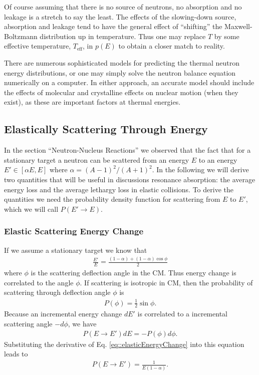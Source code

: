 \documentclass[11pt]{article}
\begin{document}
Of course assuming that there is no source of neutrons, no absorption and no leakage is a stretch to say the least.  The effects of the slowing-down source, absorption and leakage tend to have the general effect of ``shifting'' the Maxwell-Boltzmann distribution up in temperature.  Thus one may replace \(T\) by some effective temperature, \(T_{\text{eff}}\), in \(p(E)\) to obtain a closer match to reality.

There are numerous sophisticated models for predicting the thermal neutron energy distributions, or one may simply solve the neutron balance equation numerically on a computer.  In either approach, an accurate model should include the effects of molecular and crystalline effects on nuclear motion (when they exist), as these are important factors at thermal energies.
\subsection{Elastically Scattering Through Energy}
\label{sec:orgheadline34}
In the section ``Neutron-Nucleus Reactions'' we observed that the fact that for a stationary target a neutron can be scattered from an energy \(E\) to an energy \(E' \in [\alpha E, E]\) where \(\alpha = (A-1)^2/(A+1)^2\).  In the following we will derive two quantities that will be useful in discussions resonance absorption: the average energy loss and the average lethargy loss in elastic collisions.  To derive the quantities we need the probability density function for scattering from \(E\) to \(E'\), which we will call \(P(E' \rightarrow E)\).

\subsubsection{Elastic Scattering Energy Change}
\label{sec:orgheadline31}
If we assume a stationary target we know that
\begin{align}
  \label{eq::elasticEnergyChange}
  \frac{E'}{E} = \frac{(1-\alpha) + (1-\alpha) \cos\phi}{2}
\end{align}
where \(\phi\) is the scattering deflection angle in the CM.  Thus energy change is correlated to the angle \(\phi\).  If scattering is isotropic in CM, then the probability of scattering through deflection angle \(\phi\) is
\begin{align}
  P(\phi) = \frac{1}{2}\sin\phi.
\end{align}
Because an incremental energy change \(dE'\) is correlated to a incremental scattering angle \(-d\phi\), we have
\begin{align}
  P(E \rightarrow E') dE = -P(\phi) d\phi.
\end{align}
Substituting the derivative of Eq. \eqref{eq::elasticEnergyChange} into this equation leads to
\begin{align}
  P(E \rightarrow E') = \frac{1}{E(1-\alpha)}.
\end{align}
\end{document}
